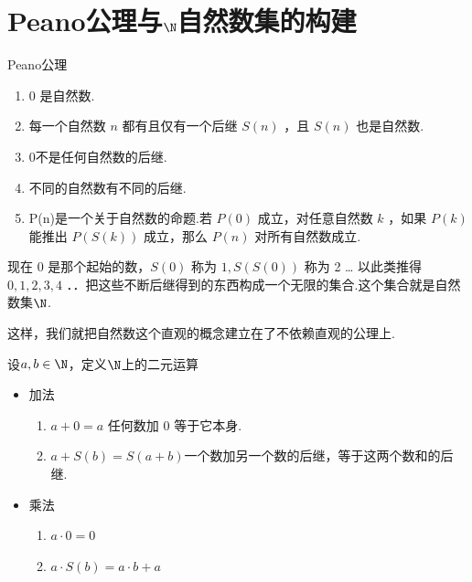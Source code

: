 \section{Peano公理与$\N$自然数集的构建}
\begin{axiom}Peano公理\label{peano}
	\begin{enumerate}
		\item 0 是自然数.
		\item 每一个自然数 $n$ 都有且仅有一个后继 $S(n)$ ，且 $S(n)$ 也是自然数.
		
		\item 0不是任何自然数的后继.
		\item 不同的自然数有不同的后继.
		\item P(n)是一个关于自然数的命题.若 $P(0)$ 成立，对任意自然数 $k$ ，如果 $P(k)$ 能推出 $P(S(k))$ 成立，那么 $P(n)$ 对所有自然数成立.
		
		
	\end{enumerate}
	
\end{axiom}

现在 $0$ 是那个起始的数，$S(0)$ 称为 $1, S(S(0))$ 称为 2 … 以此类推得 $0,1,2,3,4$ ．．把这些不断后继得到的东西构成一个无限的集合.这个集合就是自然数集$\N$.

这样，我们就把自然数这个直观的概念建立在了不依赖直观的公理上.
\begin{definition}设$a,b\in \N$，定义$\N$上的二元运算
	\begin{itemize}
		\item 加法 
		\begin{enumerate}
			\item $ a+0=a$ 任何数加 0 等于它本身.
			\item $a+S(b)=S(a+b) $一个数加另一个数的后继，等于这两个数和的后继.
		\end{enumerate}
		\item 乘法
		\begin{enumerate}
			\item $a \cdot 0=0$
			\item$ a \cdot S(b)=a \cdot b+a$
		\end{enumerate} 
	\end{itemize}
	
	
	
\end{definition}


